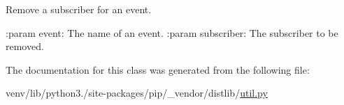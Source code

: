 \begin{DoxyVerb}Remove a subscriber for an event.

:param event: The name of an event.
:param subscriber: The subscriber to be removed.
\end{DoxyVerb}
 

The documentation for this class was generated from the following file\+:\begin{DoxyCompactItemize}
\item 
venv/lib/python3./site-\/packages/pip/\+\_\+vendor/distlib/\hyperlink{pip_2__vendor_2distlib_2util_8py}{util.\+py}\end{DoxyCompactItemize}
